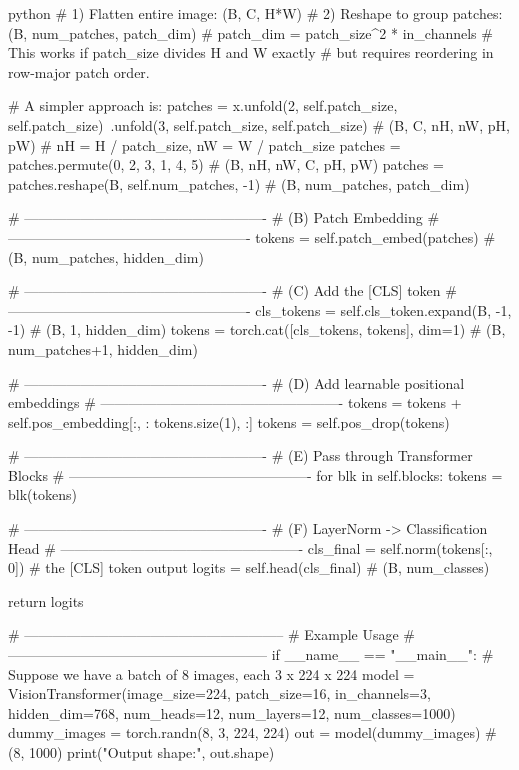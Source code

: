 \begin{mintedbox}{python}
        # 1) Flatten entire image: (B, C, H*W)
        # 2) Reshape to group patches: (B, num_patches, patch_dim)
        #    patch_dim = patch_size^2 * in_channels
        # This works if patch_size divides H and W exactly
        # but requires reordering in row-major patch order.
        
        # A simpler approach is:
        patches = x.unfold(2, self.patch_size, self.patch_size)\
        .unfold(3, self.patch_size, self.patch_size)  # (B, C, nH, nW, pH, pW)
        # nH = H / patch_size, nW = W / patch_size
        patches = patches.permute(0, 2, 3, 1, 4, 5)                # (B, nH, nW, C, pH, pW)
        patches = patches.reshape(B, self.num_patches, -1)         # (B, num_patches, patch_dim)
        
        # ----------------------------------------------------
        # (B) Patch Embedding
        # ----------------------------------------------------
        tokens = self.patch_embed(patches)  # (B, num_patches, hidden_dim)
        
        # ----------------------------------------------------
        # (C) Add the [CLS] token
        # ----------------------------------------------------
        cls_tokens = self.cls_token.expand(B, -1, -1)  # (B, 1, hidden_dim)
        tokens = torch.cat([cls_tokens, tokens], dim=1)  # (B, num_patches+1, hidden_dim)
        
        # ----------------------------------------------------
        # (D) Add learnable positional embeddings
        # ----------------------------------------------------
        tokens = tokens + self.pos_embedding[:, : tokens.size(1), :]
        tokens = self.pos_drop(tokens)
        
        # ----------------------------------------------------
        # (E) Pass through Transformer Blocks
        # ----------------------------------------------------
        for blk in self.blocks:
            tokens = blk(tokens)
        
        # ----------------------------------------------------
        # (F) LayerNorm -> Classification Head
        # ----------------------------------------------------
        cls_final = self.norm(tokens[:, 0])  # the [CLS] token output
        logits = self.head(cls_final)       # (B, num_classes)
        
        return logits

# --------------------------------------------------------
#  Example Usage
# --------------------------------------------------------
if __name__ == "__main__":
    # Suppose we have a batch of 8 images, each 3 x 224 x 224
    model = VisionTransformer(image_size=224,
    patch_size=16,
    in_channels=3,
    hidden_dim=768,
    num_heads=12,
    num_layers=12,
    num_classes=1000)
    dummy_images = torch.randn(8, 3, 224, 224)
    out = model(dummy_images)  # (8, 1000)
    print("Output shape:", out.shape)
\end{mintedbox}


